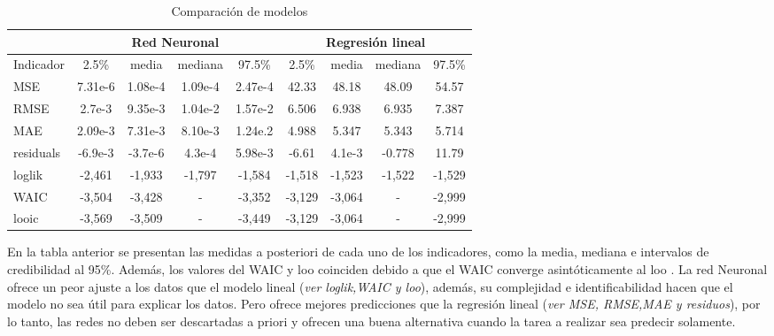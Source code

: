 \documentclass[nojss]{jss}
\begin{document}
\begin{table}[h]
\centering
\begin{tabular}{lcccc|cccc}	
          & \multicolumn{4}{c}{Red Neuronal} & \multicolumn{4}{c}{Regresión lineal}\\ 
\hline
Indicador & 2.5\% & media & mediana & 97.5\% & 2.5\% & media & mediana & 97.5\%  \\  
\hline
MSE       & 7.31e-6  & 1.08e-4 & 1.09e-4 & 2.47e-4 & 42.33 & 48.18  & 48.09  & 54.57\\ 
RMSE      & 2.7e-3   & 9.35e-3 & 1.04e-2 & 1.57e-2 & 6.506 & 6.938  & 6.935  & 7.387\\ 
MAE       & 2.09e-3  & 7.31e-3 & 8.10e-3 & 1.24e.2 & 4.988 & 5.347  & 5.343  & 5.714\\ 
residuals & -6.9e-3  & -3.7e-6 & 4.3e-4  & 5.98e-3 & -6.61 & 4.1e-3 & -0.778 & 11.79\\ 
loglik    & -2,461   &  -1,933 & -1,797  & -1,584  & -1,518& -1,523 & -1,522 & -1,529\\ 
WAIC      & -3,504   & -3,428  & -       & -3,352  & -3,129& -3,064 & -      & -2,999\\
looic     & -3,569   & -3,509  & -       & -3,449  & -3,129& -3,064 & -      & -2,999\\
\hline
\end{tabular}
\caption{Comparación de modelos} 
\label{tab:tab1}
\end{table}

En la tabla anterior se presentan las medidas a posteriori de cada uno de los indicadores, como la media, mediana  e intervalos de credibilidad al 95\%. Además, los valores del WAIC y loo coinciden debido a que el WAIC converge asintóticamente al loo \cite{vehtari}. La red Neuronal ofrece un peor ajuste a los datos que el modelo lineal (\textit{ver loglik,WAIC y loo}), además, su complejidad e identificabilidad hacen que el modelo no sea útil para explicar los datos. Pero ofrece mejores predicciones que la regresión lineal (\textit{ver MSE, RMSE,MAE y residuos}), por lo tanto, las redes no deben ser descartadas a priori y ofrecen una buena alternativa cuando la tarea a realizar sea predecir solamente.


\end{document}
